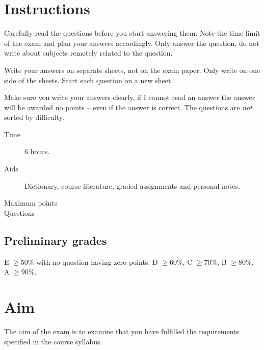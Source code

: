 \documentclass[addpoints]{miunexam}
\date{2013-01-18}
\author{%
	Daniel Bosk\\
  {\small\texttt{\href{mailto:daniel.bosk@miun.se}{daniel.bosk@miun.se}}}\\
  {\small\textit{Phone:} 060\,-\,14\,8709}\\
}
\begin{document}
\maketitle
\thispagestyle{foot}
\tableofcontents

\section*{Instructions}
\label{sec:Instructions}
\noindent
Carefully read the questions before you start answering them.
Note the time limit of the exam and plan your answers accordingly.
Only answer the question, do not write about subjects remotely related to the
question.

Write your answers on separate sheets, not on the exam paper.
Only write on one side of the sheets.
Start each question on a new sheet.

Make sure you write your answers clearly, if I cannot read an answer the answer
will be awarded no points -- even if the answer is correct.
The questions are \emph{not} sorted by difficulty.

\begin{description}
	\item[Time] 6 hours.
  \item[Aids] Dictionary, course literature, graded assignments and personal 
    notes.
	\item[Maximum points] \numpoints
	\item[Questions] \numquestions
\end{description}


\subsection*{Preliminary grades}
\noindent
E \(\geq 50\%\) with no question having zero points,
D \(\geq 60\%\),
C \(\geq 70\%\), 
B \(\geq 80\%\),
A \(\geq 90\%\).


\section*{Aim}
\label{sec:Aim}
\noindent
The aim of the exam is to examine that you have fulfilled the requirements 
specified in the course syllabus.
\end{document}
